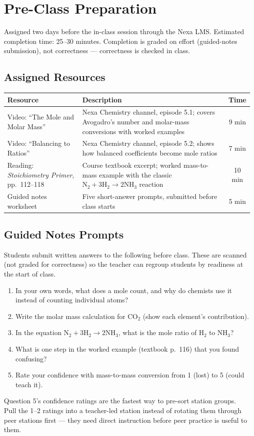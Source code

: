 \section{Pre-Class Preparation}
\label{sec:preclass}

Assigned two days before the in-class session through the Nexa LMS.
Estimated completion time: 25--30 minutes. Completion is graded on effort
(guided-notes submission), not correctness --- correctness is checked in
class.

\subsection*{Assigned Resources}

\begin{table}[H]
\centering
\small
\begin{tabularx}{\textwidth}{@{}l X c@{}}
\toprule
\textbf{Resource} & \textbf{Description} & \textbf{Time} \\
\midrule
Video: ``The Mole and Molar Mass'' & Nexa Chemistry channel, episode 5.1; covers Avogadro's number and molar-mass conversions with worked examples & 9 min \\
Video: ``Balancing to Ratios'' & Nexa Chemistry channel, episode 5.2; shows how balanced coefficients become mole ratios & 7 min \\
Reading: \emph{Stoichiometry Primer}, pp.\ 112--118 & Course textbook excerpt; worked mass-to-mass example with the classic $\mathrm{N_2 + 3H_2 \rightarrow 2NH_3}$ reaction & 10 min \\
Guided notes worksheet & Five short-answer prompts, submitted before class starts & 5 min \\
\bottomrule
\end{tabularx}
\end{table}

\subsection*{Guided Notes Prompts}

Students submit written answers to the following before class. These are
scanned (not graded for correctness) so the teacher can regroup students
by readiness at the start of class.

\begin{enumerate}[label=\textbf{Q\arabic*.}]
  \item In your own words, what does a mole count, and why do chemists use it instead of counting individual atoms?
  \item Write the molar mass calculation for $\mathrm{CO_2}$ (show each element's contribution).
  \item In the equation $\mathrm{N_2 + 3H_2 \rightarrow 2NH_3}$, what is the mole ratio of $\mathrm{H_2}$ to $\mathrm{NH_3}$?
  \item What is one step in the worked example (textbook p.\ 116) that you found confusing?
  \item Rate your confidence with mass-to-mass conversion from 1 (lost) to 5 (could teach it).
\end{enumerate}

\begin{teachertip}
Question 5's confidence ratings are the fastest way to pre-sort station
groups. Pull the 1--2 ratings into a teacher-led station instead of
rotating them through peer stations first --- they need direct
instruction before peer practice is useful to them.
\end{teachertip}
